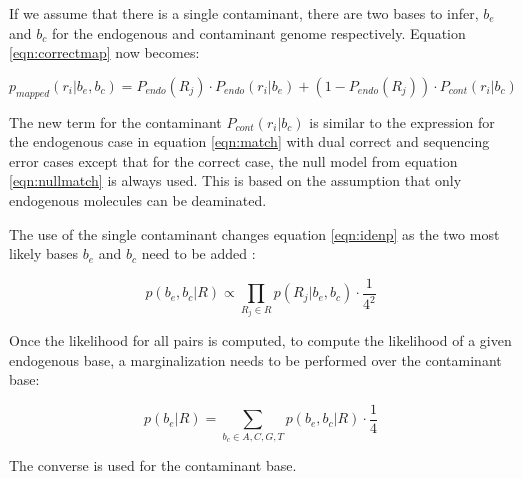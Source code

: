 \documentclass[a4paper,12pt]{article}
\begin{document}
\begin{itemize}
\begin{itemize}
If we assume that there is a single contaminant, there are two bases to infer, $b_e$ and $b_c$ for the endogenous and contaminant genome respectively. Equation \ref{eqn:correctmap} now becomes:

\begin{equation}
  p_{mapped}(r_i|b_e,b_c) =  P_{endo}(R_j) \cdot P_{endo} (r_i|b_e)   + (1-P_{endo}(R_j)) \cdot P_{cont} (r_i|b_c)
\end{equation}

\noindent The new term for the contaminant $P_{cont} (r_i|b_c)$ is similar to the expression for the endogenous case in equation \ref{eqn:match} with dual correct and sequencing error cases except that for the correct case, the null model from equation \ref{eqn:nullmatch} is always used. This is based on the assumption that only endogenous molecules can be deaminated. 

The use of the single contaminant changes equation \ref{eqn:idenp} as the two most likely bases $b_e$ and $b_c$ need to be added :

\begin{equation}
  p(b_e,b_c|R)   \propto \prod_{R_j \in R} p(R_j|b_e,b_c) \cdot \frac {1} {4^2} 
\end{equation} 

\noindent Once the likelihood for all pairs is computed, to compute the likelihood of a given endogenous base, a marginalization needs to be performed over the contaminant base: 

\begin{equation}
  p(b_e|R)   = \sum_{b_c \in {A,C,G,T}} p(b_e,b_c|R) \cdot \frac {1} {4} 
\end{equation} 

\noindent The converse is used for the contaminant base. 


























\end{itemize}
\end{itemize}
\end{document}
